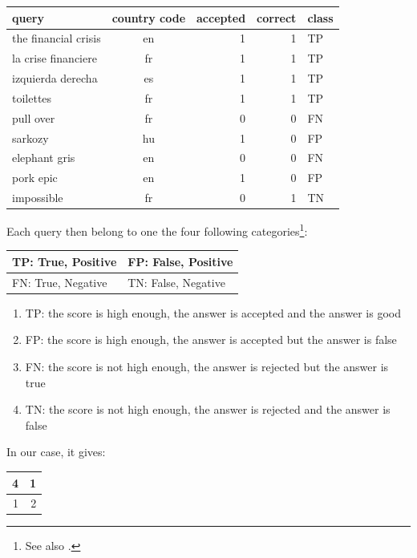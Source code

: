 \begin{center}\begin{tabular}{|l|c|r||r||l|}\hline
\textbf{query} & \textbf{country code} & \textbf{accepted} & \textbf{correct} & \textbf{class} \\ \hline
the financial crisis & en & 1 & 1 & TP\\ 
la crise financiere & fr & 1 & 1  & TP\\
izquierda derecha & es & 1 & 1  & TP\\
toilettes  & fr & 1 & 1& TP \\
pull over & fr & 0 & 0 & FN\\
sarkozy & hu & 1 & 0  & FP \\
elephant gris & en & 0 & 0 & FN \\
pork epic & en & 1 & 0 & FP  \\
impossible & fr & 0 & 1 & TN\\ \hline
\end{tabular}\end{center}

Each query then belong to one the four following categories\footnote{See also .}:

\begin{center}\begin{tabular}{|l|l|}\hline
TP: True, Positive & FP: False, Positive  \\ \hline
FN: True, Negative & TN: False, Negative \\ \hline
\end{tabular}\end{center}

\begin{enumerate}
\item TP: the score is high enough, the answer is accepted and the answer is good
\item FP: the score is high enough, the answer is accepted but the answer is false
\item FN: the score is not high enough, the answer is rejected but the answer is true
\item TN: the score is not high enough, the answer is rejected and the answer is false
\end{enumerate}

In our case, it gives:
\begin{center}\begin{tabular}{|r|r|}\hline
4  &  1 \\ \hline
1 & 2 \\ \hline
\end{tabular}\end{center}

